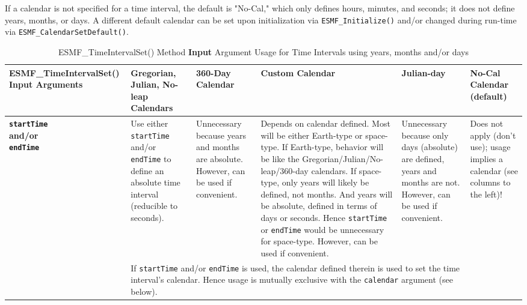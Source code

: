 If a calendar is not specified for a time interval, the default is "No-Cal," which only defines hours, minutes, and seconds; it does not define years, months, or days.  A different default calendar can be set upon initialization via {\tt ESMF\_Initialize()} and/or changed during run-time via {\tt ESMF\_CalendarSetDefault()}.
\begin{center}
\begin{table}

\caption{\label{table:timeIntervalSet}ESMF\_TimeIntervalSet() Method {\bf Input} Argument Usage for Time Intervals using years, months and/or days}

\begin{tabular}{|p{1.5in}|p{1.25in}|p{1.25in}|p{1.25in}|p{1.25in}|p{1.25in}|}
\hline

{\bf ESMF\_TimeIntervalSet() Input Arguments} &
  {\bf Gregorian, Julian, No-leap Calendars} &
  {\bf 360-Day Calendar} &
  {\bf Custom Calendar} &
  {\bf Julian-day} &
  {\bf No-Cal Calendar} (default) \\
\hline\hline

{\bf {\tt startTime} \newline
     and/or \newline
     {\tt endTime}} &

  Use either {\tt startTime} and/or {\tt endTime} to define an absolute time interval (reducible to seconds). &

  Unnecessary because years and months are absolute.  However, can be used if convenient. &

  Depends on calendar defined.  Most will be either Earth-type or space-type.  If Earth-type, behavior will be like the Gregorian/Julian/No-leap/360-day calendars.  If space-type, only years will likely be defined, not months.  And years will be absolute, defined in terms of days or seconds.  Hence {\tt startTime} or {\tt endTime} would be unnecessary for space-type.  However, can be used if convenient. &

  Unnecessary because only days (absolute) are defined, years and months are not.  However, can be used if convenient. &

  Does not apply (don't use); usage implies a calendar (see columns to the left)! \\
\cline{2-5}

  & \multicolumn{4}{l}{If {\tt startTime} and/or {\tt endTime} is used, the calendar defined therein is used to set the time interval's calendar.  Hence usage is mutually exclusive with the {\tt calendar} argument (see below).} \\
\hline


\end{tabular}
\end{table}
\end{center}
